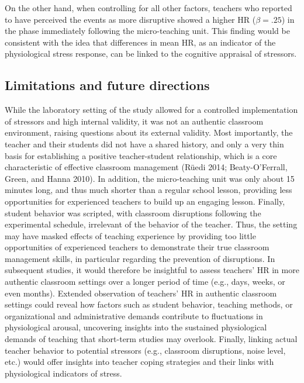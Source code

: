 \documentclass[preprint,
3p]{elsarticle} %
\begin{document}
On the other hand, when controlling for all other factors, teachers who
reported to have perceived the events as more disruptive showed a higher
HR (\(\beta = .25\)) in the phase immediately following the
micro-teaching unit. This finding would be consistent with the idea that
differences in mean HR, as an indicator of the physiological stress
response, can be linked to the cognitive appraisal of stressors.

\subsection{Limitations and future
directions}\label{limitations-and-future-directions}

While the laboratory setting of the study allowed for a controlled
implementation of stressors and high internal validity, it was not an
authentic classroom environment, raising questions about its external
validity. Most importantly, the teacher and their students did not have
a shared history, and only a very thin basis for establishing a positive
teacher-student relationship, which is a core characteristic of
effective classroom management (Rüedi 2014; Beaty-O'Ferrall, Green, and
Hanna 2010). In addition, the micro-teaching unit was only about 15
minutes long, and thus much shorter than a regular school lesson,
providing less opportunities for experienced teachers to build up an
engaging lesson. Finally, student behavior was scripted, with classroom
disruptions following the experimental schedule, irrelevant of the
behavior of the teacher. Thus, the setting may have masked effects of
teaching experience by providing too little opportunities of experienced
teachers to demonstrate their true classroom management skills, in
particular regarding the prevention of disruptions. In subsequent
studies, it would therefore be insightful to assess teachers' HR in more
authentic classroom settings over a longer period of time (e.g., days,
weeks, or even months). Extended observation of teachers' HR in
authentic classroom settings could reveal how factors such as student
behavior, teaching methods, or organizational and administrative demands
contribute to fluctuations in physiological arousal, uncovering insights
into the sustained physiological demands of teaching that short-term
studies may overlook. Finally, linking actual teacher behavior to
potential stressors (e.g., classroom disruptions, noise level, etc.)
would offer insights into teacher coping strategies and their links with
physiological indicators of stress.
\end{document}
